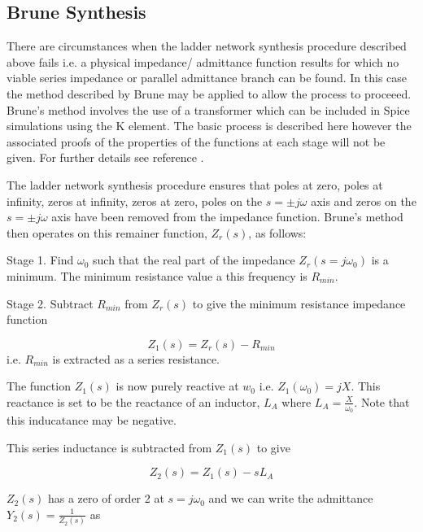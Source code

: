 %
\subsection{Brune Synthesis} 

There are circumstances when the ladder network synthesis procedure described above fails i.e. a physical impedance/ admittance function results for which no viable series impedance or parallel admittance branch can be found. In this case the method described by Brune \cite{Brune} may be applied to allow the process to proceeed. Brune's method involves the use of a transformer which can be included in Spice simulations using the K element. The basic process is described here however the associated proofs of the properties of the functions at each stage will not be given. For further details see reference \cite{Brune}.

The ladder network synthesis procedure ensures that poles at zero, poles at infinity, zeros at infinity, zeros at zero, poles on the $s=\pm j\omega$ axis and zeros on the $s=\pm j\omega$ axis have been removed from the impedance function. Brune's method then operates on this remainer function, $Z_r(s)$, as follows:

Stage 1. Find $\omega_0$ such that the real part of the impedance $Z_r(s=j\omega_0)$ is a minimum. The minimum resistance value a this frequency is $R_{min}$.

Stage 2. Subtract $R_{min}$ from $Z_r(s)$ to give the minimum resistance impedance function 

\begin{equation} \label{eq:brune_1}
Z_1\left(s\right)=Z_r\left(s\right)-R_{min}
\end{equation}
i.e. $R_{min}$ is extracted as a series resistance.

The function $Z_1\left(s\right)$ is now purely reactive at $w_0$ i.e. $Z_1\left(\omega_0\right)=jX$. This reactance is set to be the reactance of an inductor, $L_A$ where $L_A=\frac{X}{\omega_0}$. Note that this inducatance may be negative. 

This series inductance is subtracted from $Z_1(s)$ to give

\begin{equation} \label{eq:brune_2}
Z_2\left(s\right)=Z_1\left(s\right)-sL_A
\end{equation}

$Z_2\left(s\right)$ has a zero of order 2 at $s=j\omega_0$ and we can write the admittance $Y_2(s)=\frac{1}{Z_2(s)}$ as

